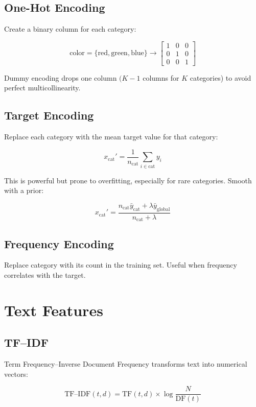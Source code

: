 \subsection{One-Hot Encoding}

Create a binary column for each category:

\[
	\text{color} = \{\text{red}, \text{green}, \text{blue}\} \to
	\begin{bmatrix}
		1 & 0 & 0 \\
		0 & 1 & 0 \\
		0 & 0 & 1
	\end{bmatrix}
\]

Dummy encoding drops one column $(K-1$ columns for $K$ categories) to avoid perfect multicollinearity.

\subsection{Target Encoding}

Replace each category with the mean target value for that category:

\[
	x_{\text{cat}}' = \frac{1}{n_{\text{cat}}} \sum_{i \in \text{cat}} y_i
\]

This is powerful but prone to overfitting, especially for rare categories. Smooth with a prior:

\[
	x_{\text{cat}}' = \frac{n_{\text{cat}} \bar{y}_{\text{cat}} + \lambda \bar{y}_{\text{global}}}{n_{\text{cat}} + \lambda}
\]

\subsection{Frequency Encoding}

Replace category with its count in the training set. Useful when frequency correlates with the target.

\section{Text Features}

\subsection{TF--IDF}

Term Frequency--Inverse Document Frequency transforms text into numerical vectors:

\[
	\text{TF--IDF}(t, d) = \text{TF}(t, d) \times \log\frac{N}{\text{DF}(t)}
\]

